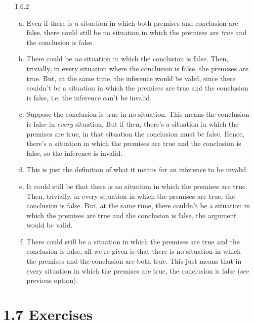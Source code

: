 \begin{enumerate}
	\item[1.6.2] \begin{enumerate}[(a)]
	
		\item Even if there is a situation in which both premises and conclusion are false, there could still be no situation in which the premises are \emph{true} and the conclusion is false.
		
		\item There could be \emph{no} situation in which the conclusion is false. Then, trivially, in every situation where the conclusion is false, the premises are true. But, at the same time, the inference would be valid, since there  couldn't be a situation in which the premises are true and the conclusion is false, i.e. the inference can't be invalid.
		
		\item Suppose the conclusion is true in no situation. This means the conclusion is false in \emph{every} situation. But if then, there's a situation in which the premises are true, in that situation the conclusion must be false. Hence, there's a situation in which the premises are true and the conclusion is false, so the inference is invalid.
		
		\item This is just the definition of what it means for an inference to be invalid.
		
		\item It could still be that there is no situation in which the premises are true. Then, trivially, in every situation in which the premises are true, the conclusion is false. But, at the same time, there couldn't be a situation in which the premises are true and the conclusion is false, the argument would be valid.
		
		\item There could still be a situation in which the premises are true and the conclusion is false, all we're given is that there is no situation in which the premises and the conclusion are both true. This just means that in every situation in which the premises are true, the conclusion is false (see previous option).
	
	\end{enumerate}
	
	\end{enumerate}
		
\section*{1.7 Exercises}

